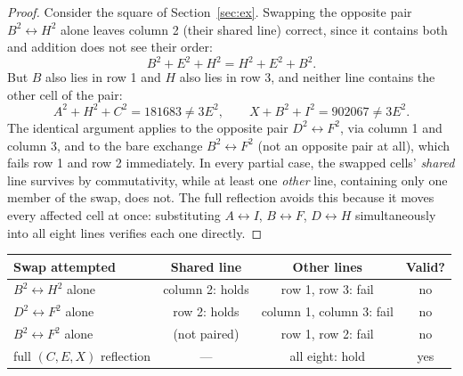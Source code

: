 \documentclass[12pt]{article}
\theoremstyle{remark}
\begin{document}
\begin{proof}
Consider the square of Section~\ref{sec:ex}. Swapping the opposite
pair $B^2\leftrightarrow H^2$ alone leaves column 2 (their shared
line) correct, since it contains both and addition does not see their
order:
\[
B^2+E^2+H^2 = H^2+E^2+B^2 .
\]
But $B$ also lies in row 1 and $H$ also lies in row 3, and neither
line contains the other cell of the pair:
\[
A^2+H^2+C^2 = 181683 \ne 3E^2, \qquad X+B^2+I^2 = 902067 \ne 3E^2 .
\]
The identical argument applies to the opposite pair
$D^2\leftrightarrow F^2$, via column 1 and column 3, and to the bare
exchange $B^2\leftrightarrow F^2$ (not an opposite pair at all), which
fails row 1 and row 2 immediately. In every partial case, the swapped
cells' \emph{shared} line survives by commutativity, while at least
one \emph{other} line, containing only one member of the swap, does
not. The full reflection avoids this because it moves every affected
cell at once: substituting $A\!\leftrightarrow\! I$,
$B\!\leftrightarrow\! F$, $D\!\leftrightarrow\! H$ simultaneously
into all eight lines verifies each one directly.
\end{proof}

\begin{center}
\begin{tabular}{lccc}
\hline
Swap attempted & Shared line & Other lines & Valid? \\
\hline
$B^2\leftrightarrow H^2$ alone & column 2: holds & row 1, row 3: fail & no \\
$D^2\leftrightarrow F^2$ alone & row 2: holds & column 1, column 3: fail & no \\
$B^2\leftrightarrow F^2$ alone & (not paired) & row 1, row 2: fail & no \\
full $(C,E,X)$ reflection & --- & all eight: hold & yes \\
\hline
\end{tabular}
\end{center}
\end{document}
